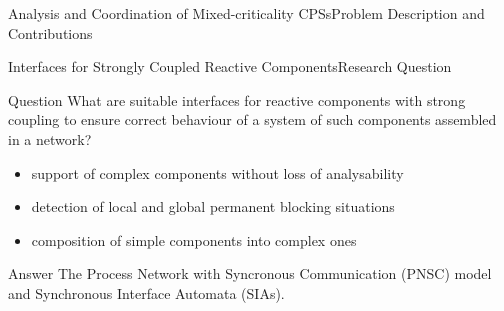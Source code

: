 \documentclass{beamer}
\begin{document}
\begin{frame}{Analysis and Coordination of Mixed-criticality CPSs}{Problem Description and Contributions}
\begin{overlayarea}{7cm}{7cm}
    \end{overlayarea}
\end{frame}
\begin{frame}{Interfaces for Strongly Coupled Reactive Components}{Research Question}
    \begin{block}{Question}
        What are suitable interfaces for reactive components with strong coupling to ensure correct behaviour of a system of such components assembled in a network?
    \end{block}
    \begin{itemize}
        \item support of complex components without loss of analysability
        \item detection of local and global permanent blocking situations
        \item composition of simple components into complex ones
    \end{itemize}
    \begin{exampleblock}{Answer}
        The Process Network with Syncronous Communication (PNSC) model and Synchronous Interface Automata (SIAs).
    \end{exampleblock}
\end{frame}
\end{document}
